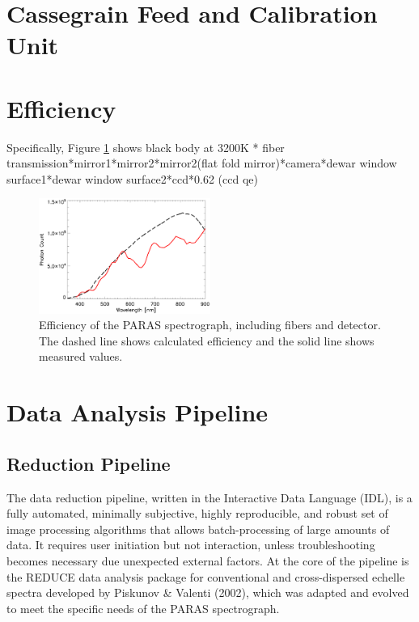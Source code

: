 \documentclass[12pt,preprint]{emulateapj}
\begin{document}
\section{Cassegrain Feed and Calibration Unit}
\section{Efficiency}

Specifically, Figure \ref{fig:efficiency} shows black body at 3200K * fiber transmission*mirror1*mirror2*mirror2(flat fold mirror)*camera*dewar window surface1*dewar window surface2*ccd*0.62 (ccd qe)

\begin{figure}[htbp] %
   \centering
   \includegraphics[width=0.5\textwidth]{efficiency_paper.eps} 
    \caption{Efficiency of the PARAS spectrograph, including fibers and detector. The dashed line shows calculated 
    efficiency and the solid line shows measured values. }
   \label{fig:efficiency}
\end{figure}

\section{Data Analysis Pipeline}

\subsection{Reduction Pipeline}
The data reduction pipeline, written in the Interactive Data Language (IDL), is a fully automated, minimally subjective, highly reproducible, and robust set of image processing algorithms that allows batch-processing of large amounts of data. It requires user initiation but not interaction, unless troubleshooting becomes necessary due unexpected external factors. At the core of the pipeline is the REDUCE data analysis package for conventional and cross-dispersed echelle spectra developed by Piskunov \& Valenti (2002), which was adapted and evolved to meet the specific needs of the PARAS spectrograph. 
\end{document}

